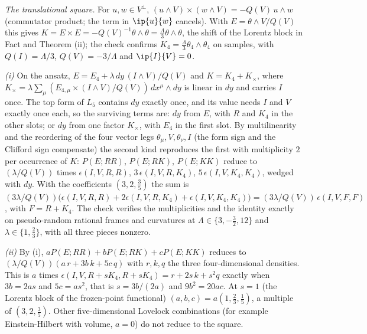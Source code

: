 \emph{The translational square.} For $u, w \in V^{\perp}$, $(u\wedge V)\times(w\wedge V) = -Q(V)\,u\wedge w$ (commutator product; the term in $\ip{u}{w}$ cancels). With $E = \theta\wedge V/Q(V)$ this gives $K = E\times E = -Q(V)^{-1}\theta\wedge\theta = \tfrac{\Lambda}{3}\theta\wedge\theta$, the shift of the Lorentz block in Fact  and Theorem (ii); the check confirms $K_{4} = \tfrac{\Lambda}{3}\theta_{4}\wedge\theta_{4}$ on samples, with $Q(I) = \Lambda/3$, $Q(V) = -3/\Lambda$ and $\ip{I}{V} = 0$.

\emph{(i)} On the ansatz, $E = E_{4} + \lambda\,dy\,(I\wedge V)/Q(V)$ and $K = K_{4} + K_{\times}$, where $K_{\times} = \lambda\sum_{\mu}(E_{4,\mu}\times(I\wedge V)/Q(V))\,dx^{\mu}\wedge dy$ is linear in $dy$ and carries $I$ once. The top form of $L_{5}$ contains $dy$ exactly once, and its value needs $I$ and $V$ exactly once each, so the surviving terms are: $dy$ from $E$, with $R$ and $K_{4}$ in the other slots; or $dy$ from one factor $K_{\times}$, with $E_{4}$ in the first slot. By multilinearity and the reordering of the four vector legs $\theta_{\mu}, V, \theta_{\nu}, I$ (the form sign and the Clifford sign compensate) the second kind reproduces the first with multiplicity $2$ per occurrence of $K$: $P(E; RR)$, $P(E; RK)$, $P(E; KK)$ reduce to $(\lambda/Q(V))$ times $\epsilon(I, V, R, R)$, $3\,\epsilon(I, V, R, K_{4})$, $5\,\epsilon(I, V, K_{4}, K_{4})$, wedged with $dy$. With the coefficients $(3, 2, \tfrac35)$ the sum is $(3\lambda/Q(V))\big(\epsilon(I, V, R, R) + 2\epsilon(I, V, R, K_{4}) + \epsilon(I, V, K_{4}, K_{4})\big) = (3\lambda/Q(V))\,\epsilon(I, V, F, F)$, with $F = R + K_{4}$. The check verifies the multiplicities and the identity exactly on pseudo-random rational frames and curvatures at $\Lambda \in \{3, -\tfrac32, 12\}$ and $\lambda \in \{1, \tfrac23\}$, with all three pieces nonzero.

\emph{(ii)} By (i), $aP(E; RR) + bP(E; RK) + cP(E; KK)$ reduces to $(\lambda/Q(V))(a\,r + 3b\,k + 5c\,q)$ with $r, k, q$ the three four-dimensional densities. This is $a$ times $\epsilon(I, V, R + sK_{4}, R + sK_{4}) = r + 2s\,k + s^{2}q$ exactly when $3b = 2as$ and $5c = as^{2}$, that is $s = 3b/(2a)$ and $9b^{2} = 20ac$. At $s = 1$ (the Lorentz block of the frozen-point functional) $(a, b, c) = a(1, \tfrac23, \tfrac15)$, a multiple of $(3, 2, \tfrac35)$. Other five-dimensional Lovelock combinations (for example Einstein-Hilbert with volume, $a = 0$) do not reduce to the square.

